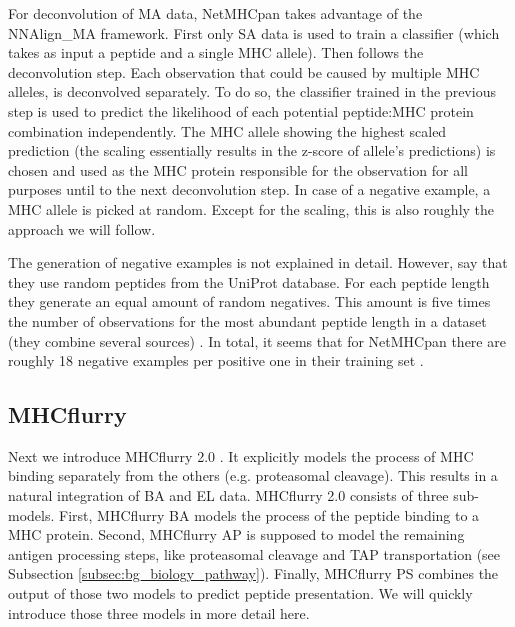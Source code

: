 \documentclass[msc,deptreport,ai]{infthesis} %
\begin{document}
	For deconvolution of \gls{MA} data, NetMHCpan takes advantage of the NNAlign\_MA \cite{alvarez_nnalign_ma_2019} framework. First only \gls{SA} data is used to train a classifier (which takes as input a peptide and a single \gls{MHC} allele). Then follows the deconvolution step. Each observation that could be caused by multiple \gls{MHC} alleles, is deconvolved separately. To do so, the classifier trained in the previous step is used to predict the likelihood of each potential peptide:MHC protein combination independently. The \gls{MHC} allele showing the highest scaled prediction (the scaling essentially results in the z-score of allele's predictions) is chosen and used as the MHC protein responsible for the observation for all purposes until to the next deconvolution step. In case of a negative example, a \gls{MHC} allele is picked at random. Except for the scaling, this is also roughly the approach  we will follow. 
	
	The generation of negative examples is not explained in detail. However, \cite{alvarez_nnalign_ma_2019} say that they use random peptides from the UniProt database. For each peptide length they generate an equal amount of random negatives. This amount is five times the number of observations for the most abundant peptide length in a dataset (they combine several sources) \cite{alvarez_nnalign_ma_2019}. In total, it seems that for NetMHCpan there are roughly 18 negative examples per positive one in their training set  \cite[Supplement Table 1]{reynisson_netmhcpan-41_2020}.
	
	\subsection{MHCflurry}
	\label{subsec:mhcflurry}
	Next we introduce MHCflurry 2.0 \cite{odonnell_mhcflurry_2020}. It explicitly models the process of \gls{MHC} binding separately from the others (e.g. proteasomal cleavage). This results in a natural integration of \gls{BA} and \gls{EL} data. MHCflurry 2.0 consists of three sub-models. First, MHCflurry BA models the process of the peptide binding to a \gls{MHC} protein. Second, MHCflurry AP is supposed to model the remaining antigen processing steps, like proteasomal cleavage and \gls{TAP} transportation (see Subsection \ref{subsec:bg_biology_pathway}). Finally, MHCflurry PS combines the output of those two models to predict peptide presentation. We will quickly introduce those three models in more detail here.
	
\end{document}
